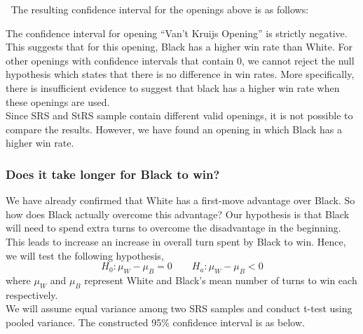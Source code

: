 \documentclass[11pt,]{article}
\begin{document}
\(~\) \newline The resulting confidence interval for the openings above
is as follows:

\begin{table}[!h]
\centering
{}
\end{table}
\newpage

The confidence interval for opening ``Van't Kruijs Opening'' is strictly
negative. This suggests that for this opening, Black has a higher win
rate than White. For other openings with confidence intervals that
contain 0, we cannot reject the null hypothesis which states that there
is no difference in win rates. More specifically, there is insufficient
evidence to suggest that black has a higher win rate when these openings
are used.\\
\newline Since SRS and StRS sample contain different valid openings, it
is not possible to compare the results. However, we have found an
opening in which Black has a higher win rate. \newpage

\hypertarget{does-it-take-longer-for-black-to-win}{%
\subsubsection{\texorpdfstring{\textbf{Does it take longer for Black to
win?}}{Does it take longer for Black to win?}}\label{does-it-take-longer-for-black-to-win}}

We have already confirmed that White has a first-move advantage over
Black. So how does Black actually overcome this advantage? Our
hypothesis is that Black will need to spend extra turns to overcome the
disadvantage in the beginning. This leads to increase an increase in
overall turn spent by Black to win. Hence, we will test the following
hypothesis,
\[H_0 : \mu_W - \mu_B = 0 \quad \quad H_a: \mu_W - \mu_B < 0\] where
\(\mu_W\) and \(\mu_B\) represent White and Black's mean number of turns
to win each respectively.\\
\newline We will assume equal variance among two SRS samples and conduct
t-test using pooled variance. The constructed 95\% confidence interval
is as below.
\end{document}
